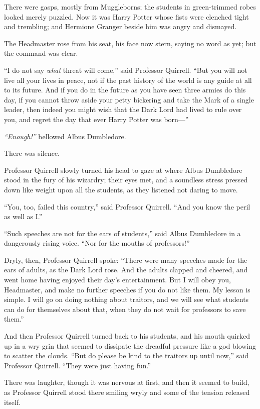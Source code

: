 There were gasps, mostly from Muggleborns; the students in green-trimmed
robes looked merely puzzled. Now it was Harry Potter whose fists were
clenched tight and trembling; and Hermione Granger beside him was angry
and dismayed.

The Headmaster rose from his seat, his face now stern, saying no word as
yet; but the command was clear.

``I do not say \emph{what} threat will come,'' said Professor Quirrell.
``But you will not live all your lives in peace, not if the past history
of the world is any guide at all to its future. And if you do in the
future as you have seen three armies do this day, if you cannot throw
aside your petty bickering and take the Mark of a single leader, then
indeed you might wish that the Dark Lord had lived to rule over you, and
regret the day that ever Harry Potter was born---''

\emph{``Enough!''} bellowed Albus Dumbledore.

There was silence.

Professor Quirrell slowly turned his head to gaze at where Albus
Dumbledore stood in the fury of his wizardry; their eyes met, and a
soundless stress pressed down like weight upon all the students, as they
listened not daring to move.

``You, too, failed this country,'' said Professor Quirrell. ``And you
know the peril as well as I.''

``Such speeches are not for the ears of students,'' said Albus
Dumbledore in a dangerously rising voice. ``Nor for the mouths of
professors!''

Dryly, then, Professor Quirrell spoke: ``There were many speeches made
for the ears of adults, as the Dark Lord rose. And the adults clapped
and cheered, and went home having enjoyed their day's entertainment. But
I will obey you, Headmaster, and make no further speeches if you do not
like them. My lesson is simple. I will go on doing nothing about
traitors, and we will see what students can do for themselves about
that, when they do not wait for professors to save them.''

And then Professor Quirrell turned back to his students, and his mouth
quirked up in a wry grin that seemed to dissipate the dreadful pressure
like a god blowing to scatter the clouds. ``But do please be kind to the
traitors up until now,'' said Professor Quirrell. ``They were just
having fun.''

There was laughter, though it was nervous at first, and then it seemed
to build, as Professor Quirrell stood there smiling wryly and some of
the tension released itself.

